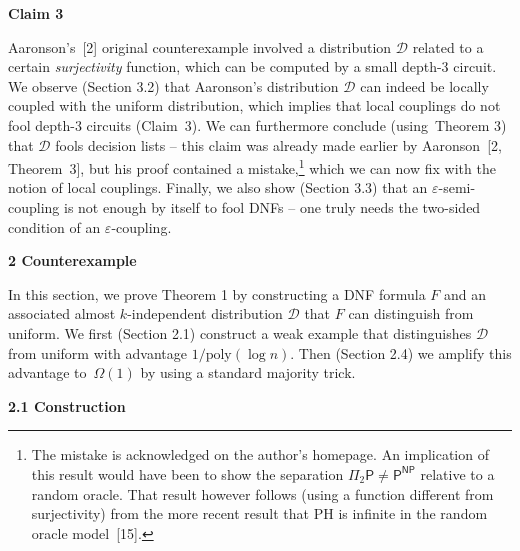 \documentclass[10pt,a4paper]{article}
\begin{document}




\par\medskip\noindent\textbf{Claim 3
}\par




Aaronson’s [2] original counterexample involved a distribution $\mathcal{D}$ related to a certain \emph{surjectivity} function, which can be computed by a small depth-3 circuit. We observe (Section 3.2) that Aaronson’s distribution $\mathcal{D}$ can indeed be locally coupled with the uniform distribution, which implies that local couplings do not fool depth-3 circuits (Claim 3). We can furthermore conclude (using Theorem 3) that $\mathcal{D}$ fools decision lists – this claim was already made earlier by Aaronson [2, Theorem 3], but his proof contained a mistake,\footnote{The mistake is acknowledged on the author’s homepage. An implication of this result would have been to show the separation $\Pi_{2}\textsf{P}\neq\textsf{P}^{\textsf{NP}}$ relative to a random oracle. That result however follows (using a function different from surjectivity) from the more recent result that PH is infinite in the random oracle model [15].} which we can now fix with the notion of local couplings. Finally, we also show (Section 3.3) that an $\varepsilon$-semi-coupling is not enough by itself to fool DNFs – one truly needs the two-sided condition of an $\varepsilon$-coupling.\par







\par\medskip\noindent\textbf{
2 Counterexample}\par




In this section, we prove Theorem 1 by constructing a DNF formula $F$ and an associated almost $k$-independent distribution $\mathcal{D}$ that $F$ can distinguish from uniform. We first (Section 2.1) construct a weak example that distinguishes $\mathcal{D}$ from uniform with advantage $1/\mathrm{poly}(\log n)$. Then (Section 2.4) we amplify this advantage to $\Omega(1)$ by using a standard majority trick.\par




\par\medskip\noindent\textbf{
2.1 Construction}\par
\end{document}
